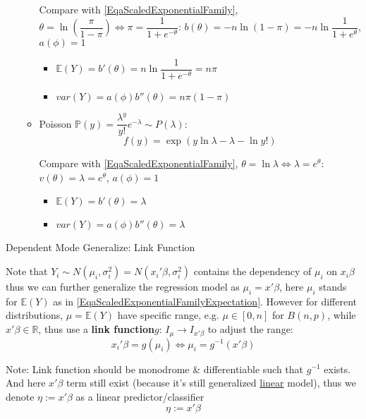 \begin{itemize}[topsep=2pt,itemsep=0pt]
\begin{itemize}[topsep=2pt,itemsep=0pt]
    Compare with \autoref{EqaScaledExponentialFamily}, $ \theta =\ln(\dfrac{\pi}{1-\pi})\Leftrightarrow \pi=\dfrac{1}{1+e^{-\theta }}$: $ b(\theta )=-n\ln(1-\pi)=-n\ln\dfrac{1}{1+e^\theta } $, $ a(\phi )=1 $
    \begin{itemize}[topsep=2pt,itemsep=0pt]
        \item $ \mathbb{E}(Y)=b'(\theta )=n\ln\dfrac{1}{1+e^{-\theta }}=n\pi $
        \item $ var(Y)=a(\phi )b''(\theta )=n\pi(1-\pi) $
    \end{itemize}
    \item Poisson $ \mathbb{P} (y)=\dfrac{\lambda^y }{y!}e^{-\lambda } \sim P(\lambda ) $:
    \begin{equation}
        f(y)=\exp\left( y\ln\lambda -\lambda-\ln y!  \right) 
    \end{equation}
    
    Compare with \autoref{EqaScaledExponentialFamily}, $ \theta =\ln\lambda \Leftrightarrow \lambda =e^\theta $: $ v(\theta )=\lambda =e^\theta  $, $ a(\phi )=1 $
    \begin{itemize}[topsep=2pt,itemsep=0pt]
        \item $ \mathbb{E}(Y)=b'(\theta )=\lambda  $
        \item $ var(Y)=a(\phi )b''(\theta )=\lambda  $
    \end{itemize}

\end{itemize}
\end{itemize}

\begin{point}
    Dependent Mode Generalize: Link Function
\end{point}

    Note that $ Y_i\sim N(\mu_i,\sigma _i^2)=N(x_i'\beta ,\sigma _i^2) $ contains the dependency of $ \mu_i  $ on  $ x_i\beta  $ thus we can further generalize the regression model as $ \mu _i=x'\beta   $, here $ \mu _i $ stands for $ \mathbb{E}(Y) $ as in \autoref{EqaScaledExponentialFamilyExpectation}. However for different distributions, $ \mu=\mathbb{E}(Y) $ have specific range, e.g. $ \mu\in [0,n] $ for $ B(n,p) $, while $ x'\beta \in \mathbb{R} $, thus use a \textbf{link function}$ g $: $ I_{\mu}\to I_{x'\beta } $ to adjust the range:
    \begin{equation}
         x_i'\beta = g(\mu_i )\Leftrightarrow \mu _i=g^{-1}(x'\beta )
    \end{equation}
    
    Note: Link function should be monodrome \& differentiable such that $ g^{-1} $ exists. And here $ x'\beta  $ term still exist (because it's still generalized \uline{linear} model), thus we denote $ \eta:=x'\beta  $ as a linear predictor/classifier
    \begin{equation}
        \eta:= x'\beta  
    \end{equation}
    
